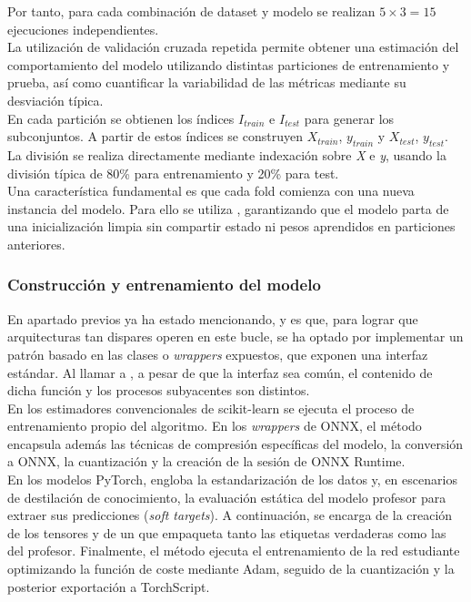 \documentclass[a4paper,12pt,twoside,final]{book}
\begin{document}
Por tanto, para cada combinación de dataset y modelo se realizan $5 \times 3 = 15$ ejecuciones independientes.\\

La utilización de validación cruzada repetida permite obtener una estimación del comportamiento del modelo utilizando
distintas particiones de entrenamiento y prueba, así como cuantificar la variabilidad de las métricas mediante su
desviación típica.\\

En cada partición se obtienen los índices $I_{train}$ e $I_{test}$ para generar los subconjuntos. A partir de estos
índices se construyen $X_{train}$, $y_{train}$ y $X_{test}$, $y_{test}$. La división se realiza directamente mediante
indexación sobre \textit{X} e \textit{y}, usando la división típica de 80\% para entrenamiento y 20\% para test.\\

Una característica fundamental es que cada fold comienza con una nueva instancia del modelo. Para ello se utiliza
, garantizando que el modelo parta de una inicialización limpia sin compartir estado ni
pesos aprendidos en particiones anteriores.

\subsubsection{Construcción y entrenamiento del modelo}
En apartado previos ya ha estado mencionando, y es que, para lograr que arquitecturas tan dispares operen en este bucle,
se ha optado por implementar un patrón basado en las clases o \textit{wrappers} expuestos, que exponen una interfaz
estándar. Al llamar a , a pesar de que la interfaz sea común, el contenido de dicha
función y los procesos subyacentes son distintos.\\

En los estimadores convencionales de scikit-learn se ejecuta el proceso de entrenamiento propio del algoritmo. En los
\textit{wrappers} de ONNX, el método  encapsula además las técnicas de compresión específicas del modelo, la
conversión a ONNX, la cuantización y la creación de la sesión de ONNX Runtime.\\

En los modelos PyTorch,  engloba la estandarización de los datos y, en escenarios de destilación de
conocimiento, la evaluación estática del modelo profesor para extraer sus predicciones (\textit{soft targets}). A
continuación, se encarga de la creación de los tensores y de un  que empaqueta tanto las etiquetas
verdaderas como las del profesor. Finalmente, el método ejecuta el entrenamiento de la red estudiante optimizando la
función de coste mediante Adam, seguido de la cuantización y la posterior exportación a TorchScript.\\
\end{document}
